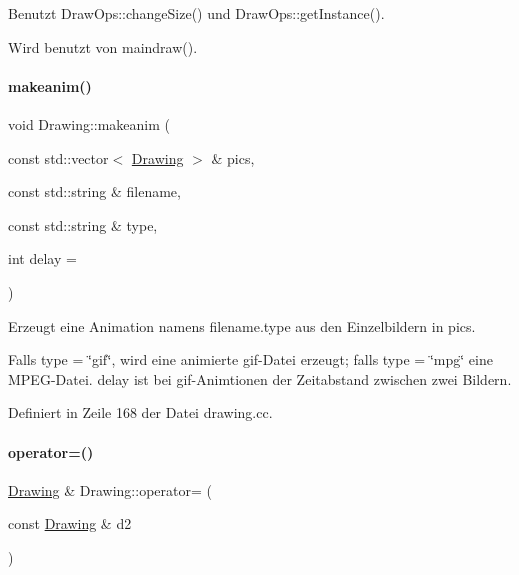 Benutzt Draw\+Ops\+::change\+Size() und Draw\+Ops\+::get\+Instance().



Wird benutzt von maindraw().

\mbox{\label{classDrawing_a3ef33783605b7ecd7159bcdb2fdd9a02}} 
\paragraph{\texorpdfstring{makeanim()}{makeanim()}}
{\footnotesize\ttfamily void Drawing\+::makeanim (\begin{DoxyParamCaption}\item[{const std\+::vector$<$ \mbox{\hyperlink{classDrawing}{Drawing}} $>$ \&}]{pics,  }\item[{const std\+::string \&}]{filename,  }\item[{const std\+::string \&}]{type,  }\item[{int}]{delay = {} }\end{DoxyParamCaption})\hspace{0.3cm}{\ttfamily [static]}}



Erzeugt eine Animation namens {\ttfamily filename.\+type} aus den Einzelbildern in pics. 

Falls {\ttfamily type} = {\ttfamily \char`\"{}gif\char`\"{}}, wird eine animierte gif-\/\+Datei erzeugt; falls {\ttfamily type} = {\ttfamily \char`\"{}mpg\char`\"{}} eine M\+P\+E\+G-\/\+Datei. {\ttfamily delay} ist bei gif-\/\+Animtionen der Zeitabstand zwischen zwei Bildern. 

Definiert in Zeile 168 der Datei drawing.\+cc.

\mbox{\label{classDrawing_aef1c7b74a454594f18aebcc0a8c17b8c}} 
\paragraph{\texorpdfstring{operator=()}{operator=()}\hspace{0.1cm}{\footnotesize\ttfamily [1/2]}}
{\footnotesize\ttfamily \mbox{\hyperlink{classDrawing}{Drawing}} \& Drawing\+::operator= (\begin{DoxyParamCaption}\item[{const \mbox{\hyperlink{classDrawing}{Drawing}} \&}]{d2 }\end{DoxyParamCaption})}



